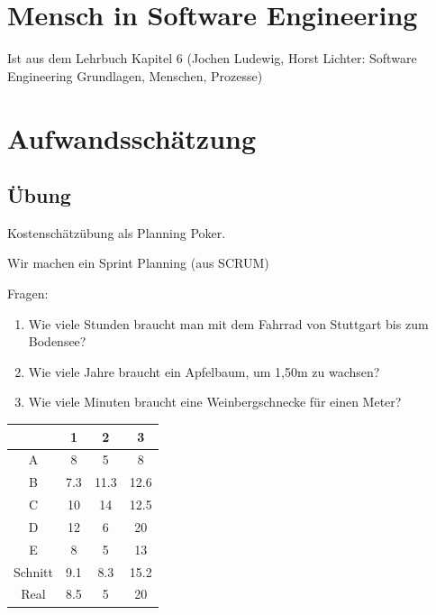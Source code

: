 \documentclass[a4paper]{article}
\title{\docTitle}
\author{Moritz}
\date{\today}
\begin{document}
\maketitle
\tableofcontents


\section{Mensch in Software Engineering}

Ist aus dem Lehrbuch Kapitel 6 (Jochen Ludewig, Horst Lichter: Software Engineering Grundlagen, Menschen, Prozesse)


\section{Aufwandsschätzung}

\subsection{Übung}

Kostenschätzübung als Planning Poker.

Wir machen ein Sprint Planning (aus SCRUM)

Fragen:

\begin{enumerate}
    \item Wie viele Stunden braucht man mit dem Fahrrad von Stuttgart bis zum Bodensee?
    \item Wie viele Jahre braucht ein Apfelbaum, um 1,50m zu wachsen?
    \item Wie viele Minuten braucht eine Weinbergschnecke für einen Meter?
\end{enumerate}

\begin{center}
    \begin{tabular}{c|c|c|c}
          & 1 & 2 & 3 \\
        \hline
        A & 8 & 5 & 8 \\
        B & 7.3 & 11.3  & 12.6 \\
        C & 10 & 14 & 12.5 \\
        D & 12 & 6 & 20 \\
        E & 8 & 5 & 13 \\
        \hline
        Schnitt & 9.1 & 8.3 & 15.2 \\
        Real & 8.5 & 5 & 20 \\
    \end{tabular}
\end{center}
\end{document}
